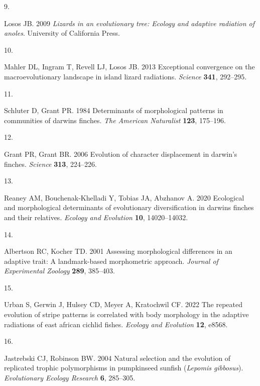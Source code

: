 \documentclass[
  11pt,
]{article}
\newlength{\cslhangindent}
\newlength{\csllabelwidth}
\newlength{\cslentryspacingunit} %
\newenvironment{CSLReferences}[2] %
 {%
  \setlength{\parindent}{0pt}
  \ifodd #1
  \let\oldpar\par
  \def\par{\hangindent=\cslhangindent\oldpar}
  \fi
  \setlength{\parskip}{#2\cslentryspacingunit}
 }%
 {}
\newcommand{\CSLLeftMargin}[1]{\parbox[t]{\csllabelwidth}{#1}}
\newcommand{\CSLRightInline}[1]{\parbox[t]{\linewidth - \csllabelwidth}{#1}\break}
\begin{document}
\begin{CSLReferences}{0}{0}
\leavevmode{}%
\CSLLeftMargin{9. }%
\CSLRightInline{Losos JB. 2009 \emph{Lizards in an evolutionary tree:
Ecology and adaptive radiation of anoles}. University of California
Press. }

\leavevmode{}%
\CSLLeftMargin{10. }%
\CSLRightInline{Mahler DL, Ingram T, Revell LJ, Losos JB. 2013
Exceptional convergence on the macroevolutionary landscape in island
lizard radiations. \emph{Science} \textbf{341}, 292--295.}

\leavevmode{}%
\CSLLeftMargin{11. }%
\CSLRightInline{Schluter D, Grant PR. 1984 Determinants of morphological
patterns in communities of darwin{\textquotesingle}s finches. \emph{The
American Naturalist} \textbf{123}, 175--196.}

\leavevmode{}%
\CSLLeftMargin{12. }%
\CSLRightInline{Grant PR, Grant BR. 2006 Evolution of character
displacement in darwin's finches. \emph{Science} \textbf{313},
224--226.}

\leavevmode{}%
\CSLLeftMargin{13. }%
\CSLRightInline{Reaney AM, Bouchenak-Khelladi Y, Tobias JA, Abzhanov A.
2020 Ecological and morphological determinants of evolutionary
diversification in darwin{\textquotesingle}s finches and their
relatives. \emph{Ecology and Evolution} \textbf{10}, 14020--14032.}

\leavevmode{}%
\CSLLeftMargin{14. }%
\CSLRightInline{Albertson RC, Kocher TD. 2001 Assessing morphological
differences in an adaptive trait: A landmark-based morphometric
approach. \emph{Journal of Experimental Zoology} \textbf{289},
385--403.}

\leavevmode{}%
\CSLLeftMargin{15. }%
\CSLRightInline{Urban S, Gerwin J, Hulsey CD, Meyer A, Kratochwil CF.
2022 The repeated evolution of stripe patterns is correlated with body
morphology in the adaptive radiations of east african cichlid fishes.
\emph{Ecology and Evolution} \textbf{12}, e8568.}

\leavevmode{}%
\CSLLeftMargin{16. }%
\CSLRightInline{Jastrebski CJ, Robinson BW. 2004 Natural selection and
the evolution of replicated trophic polymorphisms in pumpkinseed sunfish
(\emph{{L}epomis gibbosus}). \emph{Evolutionary Ecology Research}
\textbf{6}, 285--305.}


\end{CSLReferences}
\end{document}
